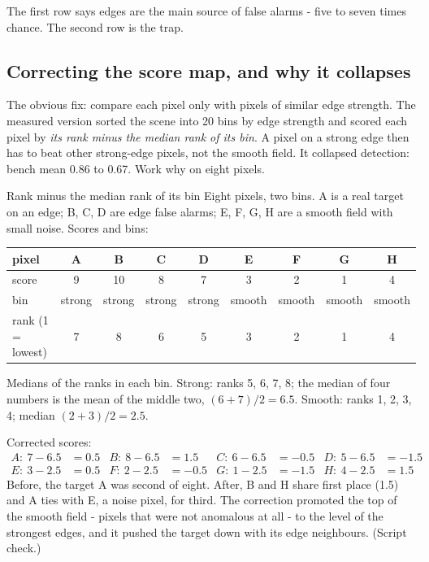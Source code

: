 The first row says edges are the main source of false alarms - five to seven times chance. The second row is the trap.

\subsection{Correcting the score map, and why it collapses}

The obvious fix: compare each pixel only with pixels of similar edge strength. The measured version sorted the scene
into 20 bins by edge strength and scored each pixel by \emph{its rank minus the median rank of its bin}. A pixel on a
strong edge then has to beat other strong-edge pixels, not the smooth field. It collapsed detection: bench mean 0.86
to 0.67. Work why on eight pixels.

\begin{worked}[label={we:ftruns:bins}]{Rank minus the median rank of its bin}
Eight pixels, two bins. A is a real target on an edge; B, C, D are edge false alarms; E, F, G, H are a smooth field
with small noise. Scores and bins:
\begin{center}
\small\setlength{\tabcolsep}{3pt}
\begin{tabular}{lcccccccc}
\toprule
pixel & A & B & C & D & E & F & G & H \\
\midrule
score & 9 & 10 & 8 & 7 & 3 & 2 & 1 & 4 \\
bin & strong & strong & strong & strong & smooth & smooth & smooth & smooth \\
rank (1 = lowest) & 7 & 8 & 6 & 5 & 3 & 2 & 1 & 4 \\
\bottomrule
\end{tabular}
\end{center}
Medians of the ranks in each bin. Strong: ranks 5, 6, 7, 8; the median of four numbers is the mean of the middle two,
$(6 + 7)/2 = 6.5$. Smooth: ranks 1, 2, 3, 4; median $(2 + 3)/2 = 2.5$.

Corrected scores:
\begin{align*}
A:\ 7 - 6.5 &= 0.5 & B:\ 8 - 6.5 &= 1.5 & C:\ 6 - 6.5 &= -0.5 & D:\ 5 - 6.5 &= -1.5\\
E:\ 3 - 2.5 &= 0.5 & F:\ 2 - 2.5 &= -0.5 & G:\ 1 - 2.5 &= -1.5 & H:\ 4 - 2.5 &= 1.5
\end{align*}
Before, the target A was second of eight. After, B and H share first place (1.5) and A ties with E, a noise pixel,
for third. The correction promoted the top of the smooth field - pixels that were not anomalous at all - to the level
of the strongest edges, and it pushed the target down with its edge neighbours. (Script check\tagC.)
\end{worked}

